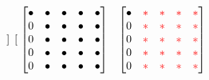 \begin{frame}
\[\begin{matrix}
\begin{bmatrix}
    \end{bmatrix}
    &
    \begin{bmatrix}
      \uch & \uch & \uch & \uch & \uch \\
      0 & \uch & \uch & \uch & \uch \\
      0 & \uch & \uch & \uch & \uch \\
      0 & \uch & \uch & \uch & \uch \\
      0 & \uch & \uch & \uch & \uch \\
    \end{bmatrix}
    &
    \begin{bmatrix}
      \uch & \ch & \ch & \ch & \ch \\
      0 & \ch & \ch & \ch & \ch \\
      0 & \ch & \ch & \ch & \ch \\
      0 & \ch & \ch & \ch & \ch \\
      0 & \ch & \ch & \ch & \ch \\
    \end{bmatrix}
  \end{matrix}
  \]

\end{frame}

